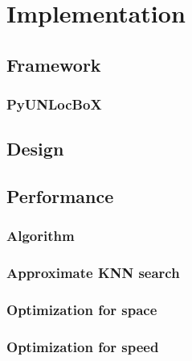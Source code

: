 

\chapter{Implementation} \label{chap:implementation}

\section{Framework}

\subsection{PyUNLocBoX}

\section{Design}

\section{Performance} \label{sec:performance}

\subsection{Algorithm}

\subsection{Approximate KNN search}

\subsection{Optimization for space}

\subsection{Optimization for speed}


